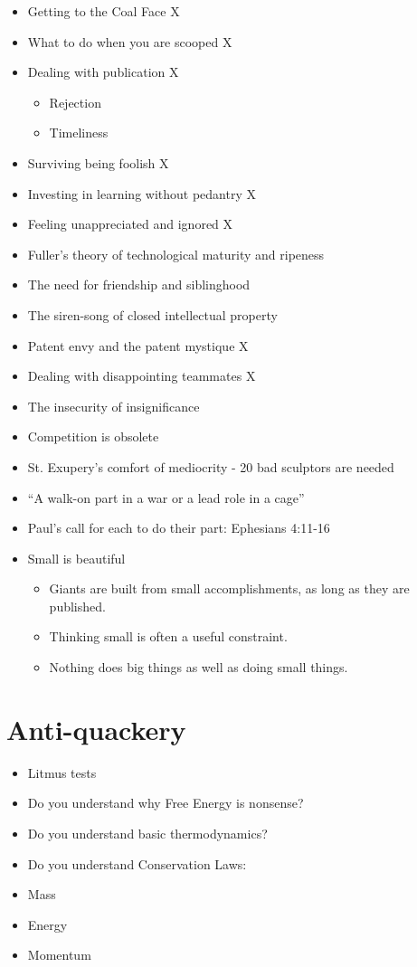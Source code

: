 \documentclass[
	fontsize=10pt, %
	twoside=false, %
	secnumdepth=1, %
]{kaobook}
\begin{document}
\begin{itemize}
\item Getting to the Coal Face X
\item What to do when you are scooped X
\item Dealing with publication X
  \begin{itemize}
\item Rejection
\item Timeliness
\end{itemize}
\item Surviving being foolish X
\item Investing in learning without pedantry X
\item Feeling unappreciated and ignored X
\item Fuller’s theory of technological maturity and ripeness
\item The need for friendship and siblinghood
\item The siren-song of closed intellectual property
\item Patent envy and the patent mystique X
\item Dealing with disappointing teammates X
\item The insecurity of insignificance
\item Competition is obsolete
\item St. Exupery’s comfort of mediocrity - 20 bad sculptors are needed
\item “A walk-on part in a war or a lead role in a cage”
\item Paul’s call for each to do their part: Ephesians 4:11-16
\item Small is beautiful
  \begin{itemize}
\item Giants are built from small accomplishments, as long as they are published.
\item Thinking small is often a useful constraint.
\item Nothing does big things as well as doing small things.
\end{itemize}
\end{itemize}

\section{Anti-quackery}
\begin{itemize}
\item Litmus tests
\item Do you understand why Free Energy is nonsense?
\item Do you understand basic thermodynamics?
\item Do you understand Conservation Laws:
\item Mass
\item Energy
\item Momentum
\end{itemize}
\end{document}
